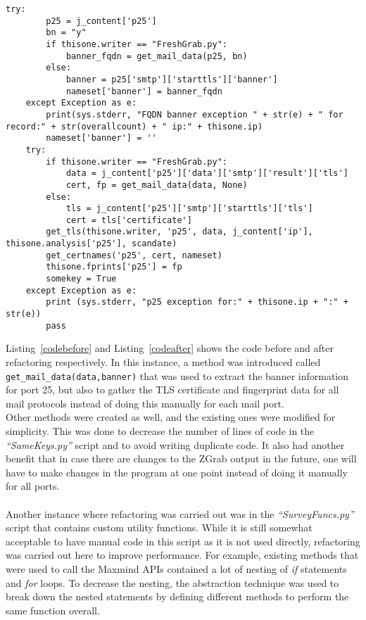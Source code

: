 \begin{lstlisting}[caption={Code After Refactoring}, captionpos=b, label={codeafter}]
    try:
        p25 = j_content['p25']
        bn = "y"
        if thisone.writer == "FreshGrab.py":
            banner_fqdn = get_mail_data(p25, bn)
        else:
            banner = p25['smtp']['starttls']['banner']
            nameset['banner'] = banner_fqdn
    except Exception as e:
        print(sys.stderr, "FQDN banner exception " + str(e) + " for record:" + str(overallcount) + " ip:" + thisone.ip)
        nameset['banner'] = ''
    try:
        if thisone.writer == "FreshGrab.py":
            data = j_content['p25']['data']['smtp']['result']['tls']
            cert, fp = get_mail_data(data, None)
        else:
            tls = j_content['p25']['smtp']['starttls']['tls']
            cert = tls['certificate']
        get_tls(thisone.writer, 'p25', data, j_content['ip'], thisone.analysis['p25'], scandate)
        get_certnames('p25', cert, nameset)
        thisone.fprints['p25'] = fp
        somekey = True
    except Exception as e:
        print (sys.stderr, "p25 exception for:" + thisone.ip + ":" + str(e))
        pass
\end{lstlisting}
Listing~\ref*{codebefore} and Listing~\ref*{codeafter} shows the code before and after refactoring respectively. In this instance, a method 
was introduced called \verb|get_mail_data(data,banner)| that was used to extract the banner information for port 25, but also to gather 
the TLS certificate and fingerprint data for all mail protocols instead of doing this manually for each mail port.\\
Other methods were created as well, and the existing ones were modified for simplicity. This was done to decrease the number of 
lines of code in the \textit{``SameKeys.py''} script and to avoid writing duplicate code. It also had another benefit that in case there 
are changes to the ZGrab output in the future, one will have to make changes in the program at one point instead of doing it manually 
for all ports.\\\\
Another instance where refactoring was carried out was in the \textit{``SurveyFuncs.py''} script that contains custom utility functions. 
While it is still somewhat acceptable to have manual code in this script as it is not used directly, refactoring was carried out here 
to improve performance. For example, existing methods that were used to call the Maxmind APIs contained a lot of nesting of \textit{if} 
statements and \textit{for} loops. To decrease the nesting, the abstraction technique was used to break down the nested statements by defining 
different methods to perform the same function overall. 

